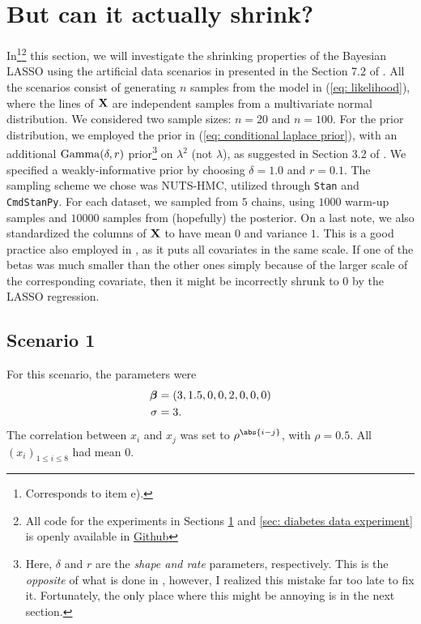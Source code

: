 \documentclass[a4paper, 10pt]{article}
\begin{document}
\section{But can it actually shrink?}
\label{sec: artificial data experiments}
In\footnote{Corresponds to item e).}\footnote{All code for the experiments in Sections \ref{sec: artificial data experiments} and \ref{sec: diabetes data experiment} is openly available in \href{https://github.com/Caioflp/bayesian-statistics-final-assignment}{Github} } this section, we will investigate the shrinking properties of the Bayesian LASSO using the artificial data scenarios in presented in the Section 7.2 of \cite{tibshirani1994lasso}.
All the scenarios consist of generating $ n $ samples from the model in (\ref{eq: likelihood}), where the lines of $ \mathbf{X} $ are independent samples from a multivariate normal distribution.
We considered two sample sizes: $ n = 20 $ and $ n = 100 $.
For the prior distribution, we employed the prior in (\ref{eq: conditional laplace prior}), with an additional $ \operatorname{Gamma} (\delta, r) $ prior\footnote{Here, $ \delta $ and $ r $ are the \emph{shape and rate} parameters, respectively. This is the \emph{opposite} of what is done in \cite{parkcasella2008bayesianlasso}, however, I realized this mistake far too late to fix it. Fortunately, the only place where this might be annoying is in the next section.} on $ \lambda^2 $ (not $\lambda$), as suggested in Section 3.2 of \cite{parkcasella2008bayesianlasso}.
We specified a weakly-informative prior by choosing $ \delta = 1.0 $ and $ r = 0.1 $.
The sampling scheme we chose was NUTS-HMC, utilized through \texttt{Stan} \cite{stan2024} and \texttt{CmdStanPy}.
For each dataset, we sampled from $ 5 $ chains, using $ 1000 $ warm-up samples and $ 10 000 $ samples from (hopefully) the posterior.
On a last note, we also standardized the columns of $ \mathbf{X} $ to have mean $ 0 $ and variance $ 1 $.
This is a good practice also employed in \cite{parkcasella2008bayesianlasso}, as it puts all covariates in the same scale.
If one of the betas was much smaller than the other ones simply because of the larger scale of the corresponding covariate, then it might be incorrectly shrunk to $ 0 $ by the LASSO regression.

\subsection*{Scenario 1}

For this scenario, the parameters were
\begin{align*}
    \boldsymbol{\beta} &= (3, 1.5, 0, 0, 2, 0, 0, 0) \\
    \sigma &= 3
.\end{align*}
The correlation between $ x_{ i } $ and $ x_{ j } $ was set to $ \rho^{ \abs{ i - j } } $, with $ \rho = 0.5 $.
All $ (x_{ i })_{ 1 \leq i \leq 8 } $ had mean $ 0 $.
\end{document}
